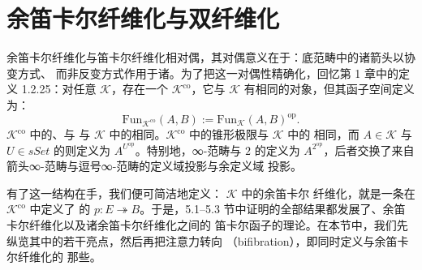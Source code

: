 \providecommand{\qcor}[1]{\ulcorner#1\urcorner}   %
\providecommand{\qcOne}{\mathbf{1}}   %
\providecommand{\qcThree}{\mathbf{3}} %
\providecommand{\cellpair}[5]{$\vcenter{\hbox{\begin{tikzpicture}[x=1.15em,y=1.15em]%
\node (s) at (0,0) {$#1$};%
\node (t) at (4.2,0) {$#2$};%
\draw[->] (0.75,0.32) to[bend left=18] (3.45,0.32);%
\node at (2.1,0.88) {$\scriptstyle#3$};%
\draw[->] (0.75,-0.32) to[bend right=18] (3.45,-0.32);%
\node at (2.1,-0.93) {$\scriptstyle#4$};%
\draw[->] (1.95,0.2) to[bend right=32] (1.95,-0.2);%
\node at (2.85,0) {$\scriptstyle#5$};%
\end{tikzpicture}}}$\ignorespaces}

\section{余笛卡尔纤维化与双纤维化}\label{sec:cocartesian-fibrations-and-bifibrations}

余笛卡尔纤维化与笛卡尔纤维化相对偶，其对偶意义在于：底范畴中的诸箭头以协变方式、
而非反变方式作用于诸\trFiber{}。为了把这一对偶性精确化，回忆第 1 章中的定义
1.2.25：对任意\trInfinityCosmos{} $\mathcal{K}$，存在一个\textbf{\trCodualInfinityCosmos}{}%
$\mathcal{K}^{\mathrm{co}}$，它与 $\mathcal{K}$ 有相同的对象，但其函子空间定义为：
\[
\mathrm{Fun}_{\mathcal{K}^{\mathrm{co}}}(A,B):=\mathrm{Fun}_{\mathcal{K}}(A,B)^{\mathrm{op}}.
\]
$\mathcal{K}^{\mathrm{co}}$ 中的\trIsofibration、\trEquivalence{}与\trTrivialFibration{}%
与 $\mathcal{K}$ 中的相同。$\mathcal{K}^{\mathrm{co}}$ 中的锥形极限与 $\mathcal{K}$ 中的
相同，而 $A\in\mathcal{K}$ 与 $U\in\mathit{sSet}$ 的\trCotensor{}则定义为
$A^{U^{\mathrm{op}}}$。特别地，∞-范畴与 $2$ 的\trCotensor{}定义为
$A^{2^{\mathrm{op}}}$，后者交换了来自箭头∞-范畴与逗号∞-范畴的定义域投影与余定义域
投影。

有了这一结构在手，我们便可简洁地定义：\trInfinityCosmos{} $\mathcal{K}$ 中的余笛卡尔
纤维化，就是一条在\trCodualInfinityCosmos{} $\mathcal{K}^{\mathrm{co}}$ 中定义了%
\trCartesianFibration{}的\trIsofibration{} $p\colon E\twoheadrightarrow B$。于是，5.1--5.3
节中证明的全部结果都发展了\trCocartesianArrow{}、余笛卡尔纤维化以及诸余笛卡尔纤维化之间的
笛卡尔函子的理论。在本节中，我们先纵览其中的若干亮点，然后再把注意力转向%
\emph{\trBifibration}（bifibration），即同时定义\trCartesianFibration{}与余笛卡尔纤维化的
那些\trIsofibration。

